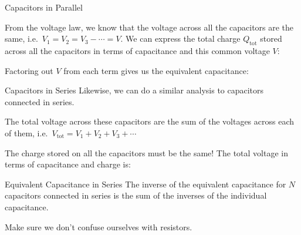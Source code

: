 \documentclass[12pt,aspectratio=169]{beamer}
\begin{document}
\begin{frame}{Capacitors in Parallel}
  \begin{center}
  \end{center}
  From the voltage law, we know that the voltage across all the capacitors are
  the same, i.e.\ $V_1=V_2=V_3-\cdots=V$. We can express the total charge
  $Q_\text{tot}$ stored across all the capacitors in terms of capacitance and
  this common voltage $V$: 

  
  \vspace{-.15in}Factoring out $V$ from each term gives us the equivalent
  capacitance:

\end{frame}


\begin{frame}{Capacitors in Series}
  Likewise, we can do a similar analysis to capacitors connected in series.
  \begin{center}
  \end{center}
  The total voltage across these capacitors are the sum of the voltages across
  each of them, i.e.\ $V_\text{tot}=V_1+V_2+V_3+\cdots$
  
  \vspace{.1in}The charge stored on all the capacitors must be the same! The
  total voltage in terms of capacitance and charge is:

\end{frame}




\begin{frame}{Equivalent Capacitance in Series}
  The inverse of the equivalent capacitance for $N$ capacitors connected in
  series is the sum of the inverses of the individual capacitance.

  
  Make sure we don't confuse ourselves with resistors.
\end{frame}
\end{document}
